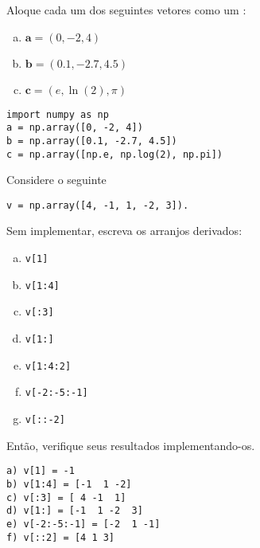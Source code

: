 
\begin{exer}
  Aloque cada um dos seguintes vetores como um {\PYTHONnumpyDOTarray}:
  \begin{enumerate}[a)]
  \item $\displaystyle\pmb{a} = (0, -2, 4)$
  \item $\displaystyle\pmb{b} = (0.1, -2.7, 4.5)$
  \item $\displaystyle\pmb{c} = (e, \ln(2), \pi)$
  \end{enumerate}
\end{exer}
\begin{resp}

\begin{lstlisting}
import numpy as np
a = np.array([0, -2, 4])
b = np.array([0.1, -2.7, 4.5])
c = np.array([np.e, np.log(2), np.pi])
\end{lstlisting}

\end{resp}

\begin{exer}
  Considere o seguinte {\PYTHONnumpyDOTarray}

\begin{lstlisting}
v = np.array([4, -1, 1, -2, 3]).
\end{lstlisting}

Sem implementar, escreva os arranjos derivados:
  \begin{enumerate}[a)]
  \item \lstinline+v[1]+
  \item \lstinline+v[1:4]+
  \item \lstinline+v[:3]+
  \item \lstinline+v[1:]+
  \item \lstinline+v[1:4:2]+
  \item \lstinline+v[-2:-5:-1]+
  \item \lstinline+v[::-2]+
  \end{enumerate}
  Então, verifique seus resultados implementando-os.
\end{exer}
\begin{resp}
  
\begin{verbatim}
a) v[1] = -1
b) v[1:4] = [-1  1 -2]
c) v[:3] = [ 4 -1  1]
d) v[1:] = [-1  1 -2  3]
e) v[-2:-5:-1] = [-2  1 -1]
f) v[::2] = [4 1 3]  
\end{verbatim}

\end{resp}

